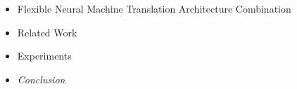 \begin{frame}

\begin{itemize}
    \item Flexible Neural Machine Translation Architecture Combination
    \item Related Work
    \item Experiments
    \item \emph{\color{UOYellow}Conclusion}
\end{itemize}

\end{frame}
